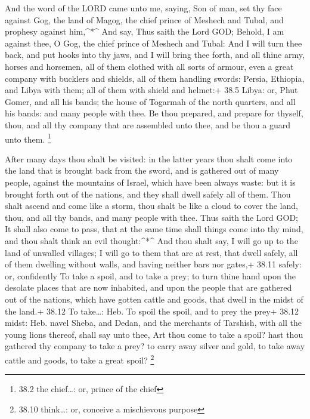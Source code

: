  And the word of the LORD came unto me, saying, 
Son of man, set thy face against Gog, the land of Magog, the chief
prince of Meshech and Tubal, and prophesy against him,\^{}*\^{}
 And say, Thus saith the Lord GOD; Behold, I am against
thee, O Gog, the chief prince of Meshech and Tubal:  And I
will turn thee back, and put hooks into thy jaws, and I will bring thee
forth, and all thine army, horses and horsemen, all of them clothed with
all sorts of armour, even a great company with bucklers and shields, all
of them handling swords:  Persia, Ethiopia, and Libya with
them; all of them with shield and helmet:+ 38.5 Libya: or, Phut
 Gomer, and all his bands; the house of Togarmah of the
north quarters, and all his bands: and many people with thee.
 Be thou prepared, and prepare for thyself, thou, and all
thy company that are assembled unto thee, and be thou a guard unto them.
\footnote{38.2 the chief\ldots: or, prince of the chief}

 After many days thou shalt be visited: in the latter years
thou shalt come into the land that is brought back from the sword, and
is gathered out of many people, against the mountains of Israel, which
have been always waste: but it is brought forth out of the nations, and
they shall dwell safely all of them.  Thou shalt ascend and
come like a storm, thou shalt be like a cloud to cover the land, thou,
and all thy bands, and many people with thee.  Thus saith
the Lord GOD; It shall also come to pass, that at the same time shall
things come into thy mind, and thou shalt think an evil
thought:\^{}*\^{}  And thou shalt say, I will go up to the
land of unwalled villages; I will go to them that are at rest, that
dwell safely, all of them dwelling without walls, and having neither
bars nor gates,+ 38.11 safely: or, confidently  To take a
spoil, and to take a prey; to turn thine hand upon the desolate places
that are now inhabited, and upon the people that are gathered out of the
nations, which have gotten cattle and goods, that dwell in the midst of
the land.+ 38.12 To take\ldots: Heb. To spoil the spoil, and to prey the
prey+ 38.12 midst: Heb. navel  Sheba, and Dedan, and the
merchants of Tarshish, with all the young lions thereof, shall say unto
thee, Art thou come to take a spoil? hast thou gathered thy company to
take a prey? to carry away silver and gold, to take away cattle and
goods, to take a great spoil? \footnote{38.10 think\ldots: or, conceive
  a mischievous purpose}

